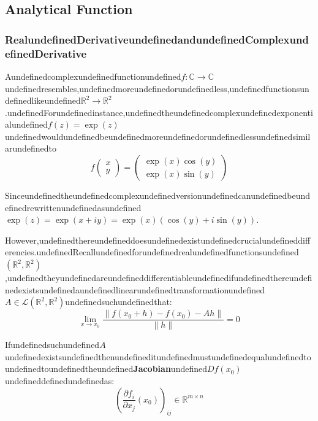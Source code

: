\subsection{Analytical Function}

\subsubsection{RealundefinedDerivativeundefinedandundefinedComplexundefinedDerivative}

Aundefinedcomplexundefinedfunctionundefined$f:\mathbb{C}\to \mathbb{C}$undefinedresembles,undefinedmoreundefinedorundefinedless,undefinedfunctionsundefinedlikeundefined$\mathbb{R}^2\to \mathbb{R}^2$.undefinedForundefinedinstance,undefinedtheundefinedcomplexundefinedexponentialundefined$f(z)=\exp(z)$undefinedwouldundefinedbeundefinedmoreundefinedorundefinedlessundefinedsimilarundefinedto
\begin{equation}
f\begin{pmatrix}
        x \\
        y
    \end{pmatrix} = 
    \begin{pmatrix}
        \exp(x)\cos(y) \\
        \exp(x)\sin(y)
    \end{pmatrix}
\end{equation}

Sinceundefinedtheundefinedcomplexundefinedversionundefinedcanundefinedbeundefinedrewrittenundefinedasundefined$\exp(z)=\exp(x+iy)=\exp(x)(\cos(y) + i\sin(y))$.

However,undefinedthereundefineddoesundefinedexistundefinedcrucialundefineddifferencies.undefinedRecallundefinedforundefinedrealundefinedfunctionsundefined$(\mathbb{R}^2, \mathbb{R}^2)$,undefinedtheyundefinedareundefineddifferentiableundefinedifundefinedthereundefinedexistsundefinedaundefinedlinearundefinedtransformationundefined$A\in \mathcal L (\mathbb{R}^2, \mathbb{R}^2)$undefinedsuchundefinedthat:
\begin{equation}
\lim_{x\to x_0} \frac{\|f(x_0+h)-f(x_0) - Ah\|}{\|h\|}=0
\end{equation}

Ifundefinedsuchundefined$A$undefinedexistsundefinedthenundefineditundefinedmustundefinedequalundefinedtoundefinedtoundefinedtheundefined\textbf{Jacobian}undefined$Df(x_0)$undefineddefinedundefinedas:
\begin{equation}
\left(\frac{\partial f_i}{\partial x_j}(x_0)\right)_{ij} \in \mathbb{R}^{m\times n}
\end{equation}

